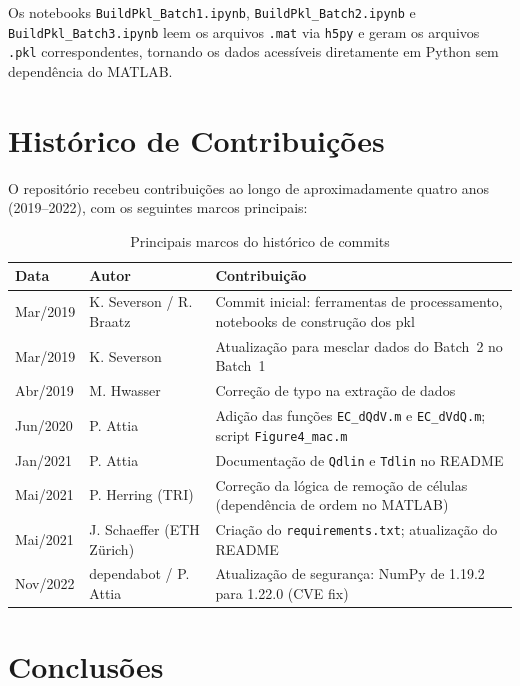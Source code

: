 \documentclass[12pt,a4paper]{article}
\begin{document}
Os notebooks \texttt{BuildPkl\_Batch1.ipynb}, \texttt{BuildPkl\_Batch2.ipynb} e
\texttt{BuildPkl\_Batch3.ipynb} leem os arquivos \texttt{.mat} via \texttt{h5py} e
geram os arquivos \texttt{.pkl} correspondentes, tornando os dados acess\'{i}veis
diretamente em Python sem depend\^{e}ncia do MATLAB.

\section{Hist\'{o}rico de Contribui\c{c}\~oes}

O reposit\'{o}rio recebeu contribui\c{c}\~oes ao longo de aproximadamente quatro anos
(2019--2022), com os seguintes marcos principais:

\begin{table}[H]
\centering
\caption{Principais marcos do hist\'{o}rico de commits}
\begin{tabular}{@{}llp{8cm}@{}}
\toprule
\textbf{Data} & \textbf{Autor} & \textbf{Contribui\c{c}\~ao} \\
\midrule
Mar/2019 & K. Severson / R. Braatz &
  Commit inicial: ferramentas de processamento, notebooks de constru\c{c}\~ao dos pkl \\
Mar/2019 & K. Severson &
  Atualiza\c{c}\~ao para mesclar dados do Batch~2 no Batch~1 \\
Abr/2019 & M. Hwasser &
  Corre\c{c}\~ao de typo na extra\c{c}\~ao de dados \\
Jun/2020 & P. Attia &
  Adi\c{c}\~ao das fun\c{c}\~oes \texttt{EC\_dQdV.m} e \texttt{EC\_dVdQ.m}; script
  \texttt{Figure4\_mac.m} \\
Jan/2021 & P. Attia &
  Documenta\c{c}\~ao de \texttt{Qdlin} e \texttt{Tdlin} no README \\
Mai/2021 & P. Herring (TRI) &
  Corre\c{c}\~ao da l\'{o}gica de remo\c{c}\~ao de c\'{e}lulas (depend\^{e}ncia de ordem no MATLAB) \\
Mai/2021 & J. Schaeffer (ETH Z\"urich) &
  Cria\c{c}\~ao do \texttt{requirements.txt}; atualiza\c{c}\~ao do README \\
Nov/2022 & dependabot / P. Attia &
  Atualiza\c{c}\~ao de seguran\c{c}a: NumPy de 1.19.2 para 1.22.0 (CVE fix) \\
\bottomrule
\end{tabular}
\end{table}

\section{Conclus\~oes}
\end{document}

